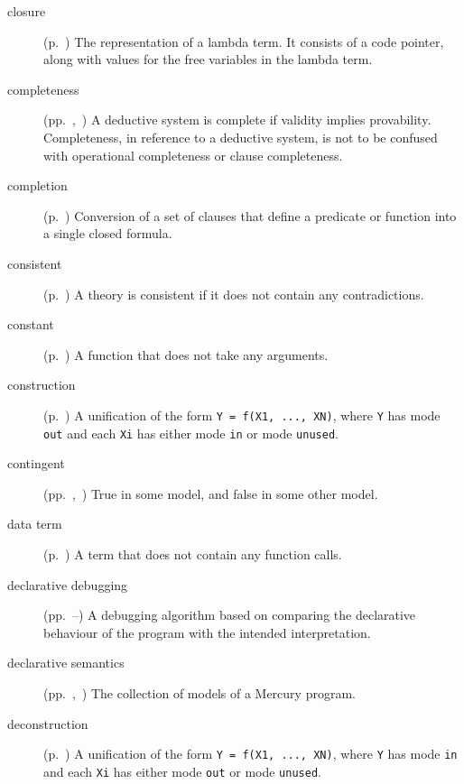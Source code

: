 \begin{description}
\item[closure]
(p.~\pageref{gi:closure})
The representation of a lambda term.
It consists of a code pointer,
along with values for the free variables
in the lambda term.

\item[completeness]
(pp.~\pageref{thm:completeness},~\pageref{gi:completeness2})
A deductive system is complete if validity implies provability.
Completeness, in reference to a deductive system,
is not to be confused with operational completeness or clause completeness.

\item[completion]
(p.~\pageref{sec:completion})
Conversion of a set of clauses that define a predicate or function
into a single closed formula.

\item[consistent]
(p.~\pageref{gi:consistent})
A theory is consistent if it does not contain any contradictions.

\item[constant]
(p.~\pageref{gi:constant})
A function that does not take any arguments.

\item[construction]
(p.~\pageref{gi:construction})
A unification of the form \texttt{Y = f(X1, ..., XN)},
where \texttt{Y} has mode \texttt{out}
and each \texttt{Xi} has either mode \texttt{in}
or mode \texttt{unused}.

\item[contingent]
(pp.~\pageref{gi:contingent},~\pageref{gi:contingent2})
True in some model, and false in some other model.

\item[data term]
(p.~\pageref{gi:data-term})
A term that does not contain any function calls.

\item[declarative debugging]
(pp.~\pageref{sec:decl-debug}--\pageref{end:decl-debug})
A debugging algorithm based on
comparing the declarative behaviour of the program
with the intended interpretation.

\item[declarative semantics]
(pp.~\pageref{sec:by-example},~\pageref{def:declarative-semantics})
The collection of models of a Mercury program.

\item[deconstruction]
(p.~\pageref{gi:deconstruction})
A unification of the form \texttt{Y = f(X1, ..., XN)},
where \texttt{Y} has mode \texttt{in}
and each \texttt{Xi} has either mode \texttt{out}
or mode \texttt{unused}.


\end{description}
